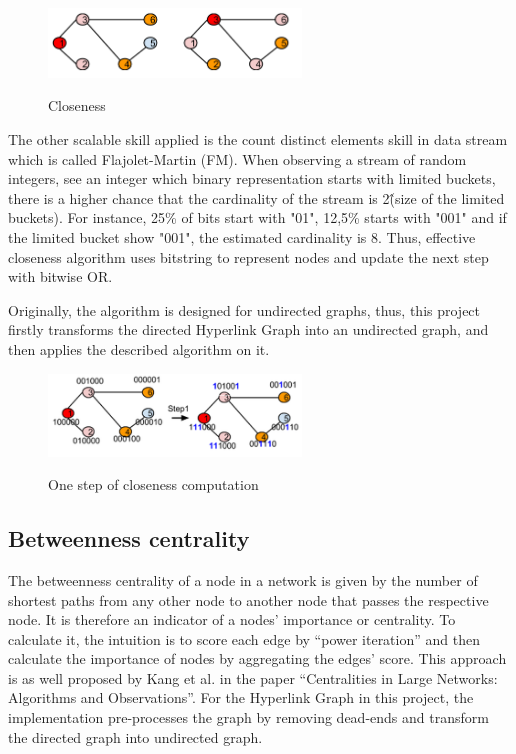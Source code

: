 \begin{figure}[H]
	\begin{center}
		\label{fig3}		
		\includegraphics[width=0.6\textwidth]{fig3}	
		\caption{Closeness}	
	\end{center}
\end{figure}

The other scalable skill applied is the count distinct elements skill in data stream which is called Flajolet-Martin (FM).  When observing a stream of random integers, see an integer which binary representation starts with limited buckets, there is a higher chance that the cardinality of the stream is 2\^(size of the limited buckets). For instance, 25\% of bits start with "01", 12,5\% starts with "001" and if the limited bucket show "001", the estimated cardinality is 8. Thus, effective closeness algorithm uses bitstring to represent nodes and update the next step with bitwise OR. 

Originally, the algorithm is designed for undirected graphs, thus, this project firstly transforms the directed Hyperlink Graph into an undirected graph, and then applies the described algorithm on it.

\begin{figure}[H]
	\begin{center}
		\label{fig4}		
		\includegraphics[width=0.6\textwidth]{fig4}	
		\caption{One step of closeness computation}	
	\end{center}
\end{figure}

\subsection{Betweenness centrality}
The betweenness centrality of a node in a network is given by the number of shortest paths from any other node to another node that passes the respective node. It is therefore an indicator of a nodes’ importance or centrality. To calculate it, the intuition is to score each edge by “power iteration” and then calculate the importance of nodes by aggregating the edges’ score. This approach is as well proposed by Kang et al. in the paper “Centralities in Large Networks: Algorithms and Observations”. For the Hyperlink Graph in this project, the implementation pre-processes the graph by removing dead-ends and transform the directed graph into undirected graph.

